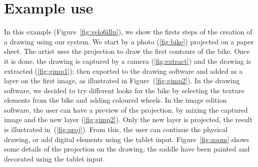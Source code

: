 \documentclass{article}
\begin{document}
\section{Example use}

In this example (Figure~\ref{fig:velo6illu}), we show the firsts steps of the creation of a drawing using our system. We start by a photo (\ref{fig:bike}) projected on a paper sheet. The artist uses the projection to draw the first contours of the bike. Once it is done, the drawing is captured by a camera (\ref{fig:extract}) and the drawing is extracted (\ref{fig:gimp1}); then exported to the drawing software and added as a layer on the first image, as illustrated in Figure~(\ref{fig:gimp2}). 
In the drawing software, we decided to try different looks for the bike by selecting the texture elements from the bike and adding coloured wheels.
In the image edition software, the user can have a preview of the projection, by mixing the captured image and the new layer (\ref{fig:gimp2}). Only the new layer is projected, the result is illustrated in~(\ref{fig:proj}). From this, the user can continue the physical drawing, or add digital elements using the tablet input. Figure~\ref{fig:zoom} shows some details of the projection on the drawing, the saddle have been painted and decorated using the tablet input. 
\end{document}

